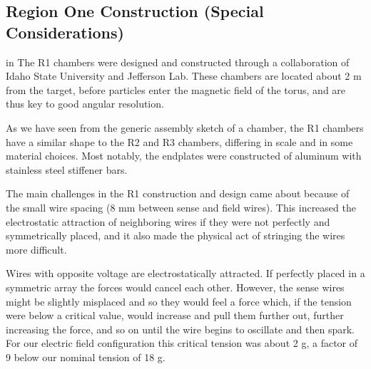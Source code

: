 \subsection{Region One Construction (Special Considerations)}

 in 
The R1 chambers were designed and constructed through a collaboration 
of Idaho State University and Jefferson Lab.  These 
chambers are located about 2 m from the target, 
before particles enter the magnetic field of the torus,
and are thus key to good angular resolution. 

As we have seen from the generic assembly sketch of a chamber, the R1
chambers have a similar shape to the R2 and R3 chambers, differing in
scale and in some material choices.
Most notably, the endplates were constructed of aluminum with stainless
steel stiffener bars.

The main challenges in the R1 construction and design came about because
of the small wire spacing (8 mm between sense and field wires).  This
increased the electrostatic attraction of neighboring wires if they were
not perfectly and symmetrically placed, and it also made the physical act
of stringing the wires more difficult.

Wires with opposite voltage are electrostatically attracted.  If perfectly
placed in a symmetric array the forces would cancel each other. 
However, the sense wires might be slightly misplaced and so they would feel
a force which, if the tension were below a critical value, would increase
and pull them further out, further increasing the force, and so on until 
the wire begins to oscillate and then spark.  For our electric field configuration
this critical tension was about 2 g, a factor of 9 below our nominal
tension of 18 g.

